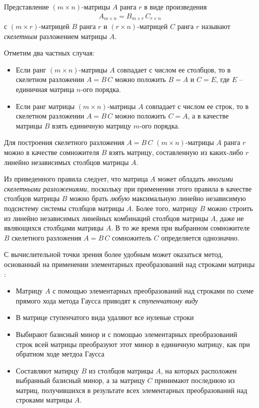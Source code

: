 \documentclass[%
	11pt,
	a4paper,
	utf8,
		]{article}
\begin{document}
Представление $ (m \times n) $-матрицы $ A $ ранга $ r $ в виде произведения
\begin{align*}
	A_{m \times n} = B_{m \times r} \, C_{r \times n}
\end{align*}
с $ (m \times r) $-матрицей $ B $ ранга $ r $ и $ (r \times n) $-матрицей $ C $ ранга $ r $ называют \emph{скелетным} разложением матрицы $ A $.

Отметим два частных случая:
\begin{itemize}
	\item Если ранг $ (m \times n) $-матрицы $ A $ совпадает с числом ее столбцов, то в скелетном разложении $ A = B \, C $ можно положить $ B = A $ и $ C = E $, где $ E $ -- единичная матрица $ n $-ого порядка.
	
	\item Если ранг матрицы $ (m \times n) $-матрицы $ A $ совпадает с числом ее строк, то в скелетном разложении $ A = B \, C $ можно положить $ C = A $, а в качестве матрицы $ B $ взять единичную матрицу $ m $-ого порядка.
\end{itemize}

Для построения скелетного разложения $ A = B\,C $ $ (m \times n) $-матрицы $ A $ ранга $ r $ можно в качестве сомножителя $ B $ взять матрицу, составленную из каких-либо $ r $ линейно независимых столбцов матрицы $ A $.

Из приведенного правила следует, что матрица $ A $ может обладать \emph{многими скелетными разложениями}, поскольку при применении этого правила в качестве столбцов матрицы $ B $ можно брать \emph{любую} максимальную линейно независимую подсистему системы столбцов матрицы $ A $. Более того, матрицу $ B $ можно строить из линейно независимых линейных комбинаций столбцов матрицы $ A $, даже не являющихся столбцами матрицы $ A $. В то же время при выбранном сомножителе $ B $ скелетного разложения $ A = B \, C $ сомножитель $ C $ определяется однозначно.

С вычислительной точки зрения более удобным может оказаться метод, основанный на применении элементарных преобразований над строками матрицы \cite[]{shevtsov:linal-2012}:
\begin{itemize}
	\item Матрицу  $ A $ с помощью элементарных преобразований над строками по схеме прямого хода метода Гаусса приводят к \emph{ступенчатому виду}
	
	\item В матрице ступенчатого вида удаляют все нулевые строки
	
	\item Выбирают базисный минор и с помощью элементарных преобразований строк всей матрицы преобразуют этот минор в единичную матрицу, как при обратном ходе метдоа Гаусса 
	
	\item Составляют матирцу $ B $ из столбцов матрицы $ A $, на которых расположен выбранный базисный минор, а за матрицу $ C $ принимают последнюю из матриц, получившихся в результате всех элементарных преобразований над строками матрицы $ A $. 
\end{itemize}
\end{document}
